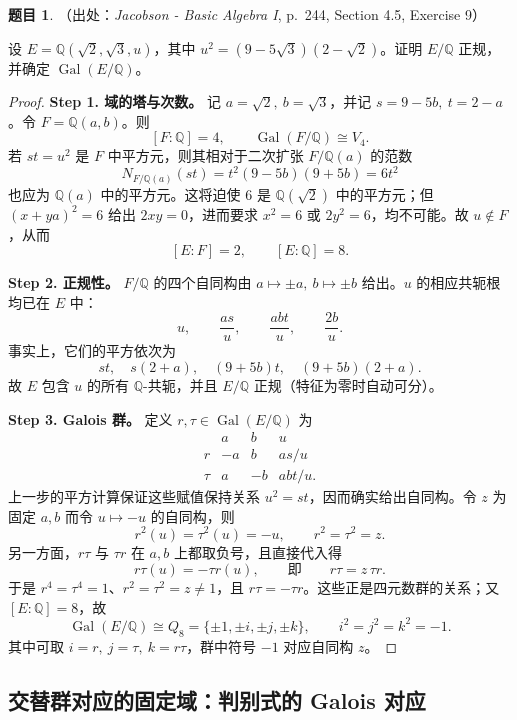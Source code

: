 \documentclass[a4paper]{ctexart}
\theoremstyle{definition}
\newtheorem{example}{题目}[section]
\theoremstyle{analysis}
\theoremstyle{plain}
\begin{document}
\begin{example}
（出处：\textit{Jacobson - Basic Algebra I}, p.~244, Section 4.5, Exercise 9）

设 \(E=\mathbb Q(\sqrt2,\sqrt3,u)\)，其中 \(u^2=(9-5\sqrt3)(2-\sqrt2)\)。证明 \(E/\mathbb Q\) 正规，并确定 \(\operatorname{Gal}(E/\mathbb Q)\)。

\begin{proof}
\textbf{Step 1. 域的塔与次数。}
记 \(a=\sqrt2,\ b=\sqrt3\)，并记 \(s=9-5b,\ t=2-a\)。令 \(F=\mathbb Q(a,b)\)。则
\[
  [F:\mathbb Q]=4,\qquad \operatorname{Gal}(F/\mathbb Q)\cong V_4.
\]
若 \(st=u^2\) 是 \(F\) 中平方元，则其相对于二次扩张 \(F/\mathbb Q(a)\) 的范数
\[
  N_{F/\mathbb Q(a)}(st)=t^2(9-5b)(9+5b)=6t^2
\]
也应为 \(\mathbb Q(a)\) 中的平方元。这将迫使 \(6\) 是 \(\mathbb Q(\sqrt2)\) 中的平方元；但
\((x+ya)^2=6\) 给出 \(2xy=0\)，进而要求 \(x^2=6\) 或 \(2y^2=6\)，均不可能。故 \(u\notin F\)，从而
\[
  [E:F]=2,\qquad [E:\mathbb Q]=8.
\]

\textbf{Step 2. 正规性。}
\(F/\mathbb Q\) 的四个自同构由 \(a\mapsto\pm a,\ b\mapsto\pm b\) 给出。\(u\) 的相应共轭根均已在 \(E\) 中：
\[
  u,\qquad \frac{as}{u},\qquad \frac{abt}{u},\qquad \frac{2b}{u}.
\]
事实上，它们的平方依次为
\[
  st,\quad s(2+a),\quad (9+5b)t,\quad (9+5b)(2+a).
\]
故 \(E\) 包含 \(u\) 的所有 \(\mathbb Q\)-共轭，并且 \(E/\mathbb Q\) 正规（特征为零时自动可分）。

\textbf{Step 3. Galois 群。}
定义 \(r,\tau\in\operatorname{Gal}(E/\mathbb Q)\) 为
\[
\begin{array}{c|ccc}
 &a&b&u\\ \hline
 r&-a&b&as/u\\
 \tau&a&-b&abt/u.
\end{array}
\]
上一步的平方计算保证这些赋值保持关系 \(u^2=st\)，因而确实给出自同构。令
\(z\) 为固定 \(a,b\) 而令 \(u\mapsto-u\) 的自同构，则
\[
  r^2(u)=\tau^2(u)=-u,\qquad r^2=\tau^2=z.
\]
另一方面，\(r\tau\) 与 \(\tau r\) 在 \(a,b\) 上都取负号，且直接代入得
\[
  r\tau(u)=-\tau r(u),\qquad\text{即}\qquad r\tau=z\,\tau r.
\]
于是 \(r^4=\tau^4=1\)、\(r^2=\tau^2=z\neq1\)，且 \(r\tau=-\tau r\)。这些正是四元数群的关系；又
\([E:\mathbb Q]=8\)，故
\[
  \operatorname{Gal}(E/\mathbb Q)\cong Q_8
  =\{\pm1,\pm i,\pm j,\pm k\},\qquad i^2=j^2=k^2=-1.
\]
其中可取 \(i=r,\ j=\tau,\ k=r\tau\)，群中符号 \(-1\) 对应自同构 \(z\)。
\end{proof}
\end{example}

\subsection{\texorpdfstring{交替群对应的固定域：判别式的 Galois 对应}{交替群对应的固定域：判别式的 Galois 对应}}\label{subsec:problem-alternating-discriminant}
\end{document}
